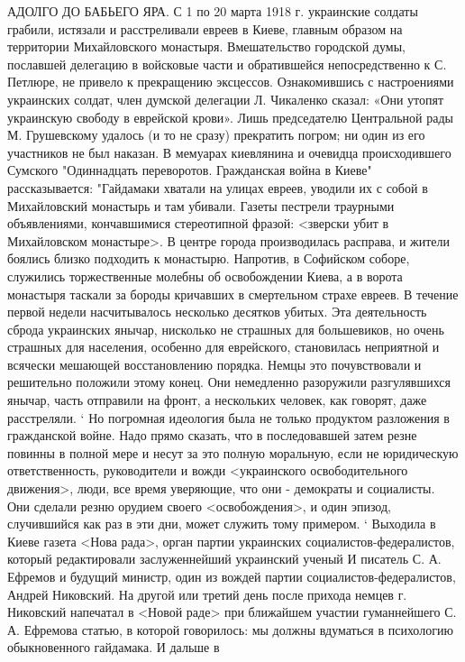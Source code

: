 АДОЛГО ДО БАБЬЕГО ЯРА.
С 1 по 20 марта 1918 г. украинские солдаты грабили, истязали и расстреливали евреев в Киеве, главным образом на территории Михайловского монастыря. Вмешательство городской думы, пославшей делегацию в войсковые части и обратившейся непосредственно к С. Петлюре, не привело к прекращению эксцессов. Ознакомившись с настроениями украинских солдат, член думской делегации Л. Чикаленко сказал: «Они утопят украинскую свободу в еврейской крови». Лишь председателю Центральной рады М. Грушевскому удалось (и то не сразу) прекратить погром; ни один из его участников не был наказан.
В мемуарах киевлянина и очевидца происходившего Сумского "Одиннадцать переворотов. Гражданская война в Киеве" рассказывается:
"Гайдамаки хватали на улицах евреев, уводили их с собой в
Михайловский монастырь и там убивали. Газеты пестрели траурными объявлениями, кончавшимися стереотипной фразой: <зверски убит в Михайловском монастыре>. В центре города производилась расправа, и жители боялись близко подходить к монастырю. Напротив, в Софийском соборе, служились торжественные молебны об
освобождении Киева, а в ворота монастыря таскали за бороды
кричавших в смертельном страхе евреев. В течение первой недели насчитывалось несколько десятков убитых. Эта деятельность сброда украинских янычар, нисколько не страшных для большевиков, но очень страшных для населения, особенно для еврейского, становилась неприятной и всячески мешающей восстановлению порядка.
Немцы это почувствовали и решительно положили этому конец.
Они немедленно разоружили разгулявшихся янычар, часть отправили на фронт, а нескольких человек, как говорят, даже расстреляли.
`
Но погромная идеология была не только продуктом разложения в гражданской войне. Надо прямо сказать, что в последовавшей затем резне повинны в полной мере и несут за это полную моральную, если не юридическую ответственность, руководители и вожди <украинского освободительного движения>, люди, все время уверяющие, что они - демократы и социалисты. Они сделали резню орудием своего <освобождения>, и один эпизод, случившийся как
раз в эти дни, может служить тому примером.
`
Выходила в Киеве газета <Нова рада>, орган партии украинских
социалистов-федералистов, который редактировали заслуженнейший украинский ученый И писатель С. А. Ефремов и будущий министр, один из вождей партии социалистов-федералистов, Андрей Никовский. На другой или третий день после прихода немцев г. Никовский напечатал в <Новой раде> при ближайшем участии гуманнейшего С. А. Ефремова статью, в которой говорилось: мы должны
вдуматься в психологию обыкновенного гайдамака. И дальше в
